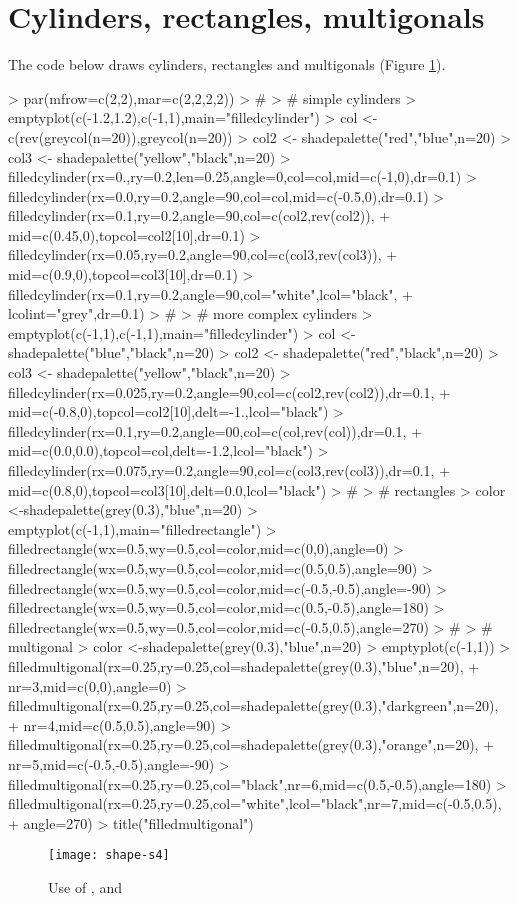 \documentclass[article,nojss]{jss}
\begin{document}
\section{Cylinders, rectangles, multigonals}
The code below draws cylinders, rectangles and multigonals (Figure \ref{fig:s4}).
\begin{Schunk}
\begin{Sinput}
> par(mfrow=c(2,2),mar=c(2,2,2,2))
> #
> # simple cylinders
> emptyplot(c(-1.2,1.2),c(-1,1),main="filledcylinder")
> col  <- c(rev(greycol(n=20)),greycol(n=20))
> col2 <- shadepalette("red","blue",n=20)
> col3 <- shadepalette("yellow","black",n=20)
> filledcylinder(rx=0.,ry=0.2,len=0.25,angle=0,col=col,mid=c(-1,0),dr=0.1)
> filledcylinder(rx=0.0,ry=0.2,angle=90,col=col,mid=c(-0.5,0),dr=0.1)
> filledcylinder(rx=0.1,ry=0.2,angle=90,col=c(col2,rev(col2)),
+                mid=c(0.45,0),topcol=col2[10],dr=0.1)
> filledcylinder(rx=0.05,ry=0.2,angle=90,col=c(col3,rev(col3)),
+                mid=c(0.9,0),topcol=col3[10],dr=0.1)
> filledcylinder(rx=0.1,ry=0.2,angle=90,col="white",lcol="black",
+                lcolint="grey",dr=0.1)
> #
> # more complex cylinders
> emptyplot(c(-1,1),c(-1,1),main="filledcylinder")
> col  <- shadepalette("blue","black",n=20)
> col2 <- shadepalette("red","black",n=20)
> col3 <- shadepalette("yellow","black",n=20)
> filledcylinder(rx=0.025,ry=0.2,angle=90,col=c(col2,rev(col2)),dr=0.1,
+                mid=c(-0.8,0),topcol=col2[10],delt=-1.,lcol="black")
> filledcylinder(rx=0.1,ry=0.2,angle=00,col=c(col,rev(col)),dr=0.1,
+                mid=c(0.0,0.0),topcol=col,delt=-1.2,lcol="black")
> filledcylinder(rx=0.075,ry=0.2,angle=90,col=c(col3,rev(col3)),dr=0.1,
+                mid=c(0.8,0),topcol=col3[10],delt=0.0,lcol="black")
> #
> # rectangles
> color <-shadepalette(grey(0.3),"blue",n=20)
> emptyplot(c(-1,1),main="filledrectangle")
> filledrectangle(wx=0.5,wy=0.5,col=color,mid=c(0,0),angle=0)
> filledrectangle(wx=0.5,wy=0.5,col=color,mid=c(0.5,0.5),angle=90)
> filledrectangle(wx=0.5,wy=0.5,col=color,mid=c(-0.5,-0.5),angle=-90)
> filledrectangle(wx=0.5,wy=0.5,col=color,mid=c(0.5,-0.5),angle=180)
> filledrectangle(wx=0.5,wy=0.5,col=color,mid=c(-0.5,0.5),angle=270)
> #
> # multigonal
> color <-shadepalette(grey(0.3),"blue",n=20)
> emptyplot(c(-1,1))
> filledmultigonal(rx=0.25,ry=0.25,col=shadepalette(grey(0.3),"blue",n=20),
+                  nr=3,mid=c(0,0),angle=0)
> filledmultigonal(rx=0.25,ry=0.25,col=shadepalette(grey(0.3),"darkgreen",n=20),
+                  nr=4,mid=c(0.5,0.5),angle=90)
> filledmultigonal(rx=0.25,ry=0.25,col=shadepalette(grey(0.3),"orange",n=20),
+                  nr=5,mid=c(-0.5,-0.5),angle=-90)
> filledmultigonal(rx=0.25,ry=0.25,col="black",nr=6,mid=c(0.5,-0.5),angle=180)
> filledmultigonal(rx=0.25,ry=0.25,col="white",lcol="black",nr=7,mid=c(-0.5,0.5),
+                  angle=270)
> title("filledmultigonal")
\end{Sinput}
\end{Schunk}
\begin{figure}
\begin{center}
\texttt{[image: shape-s4]}
\end{center}
\caption{Use of ,  and }
\label{fig:s4}
\end{figure}
\end{document}
